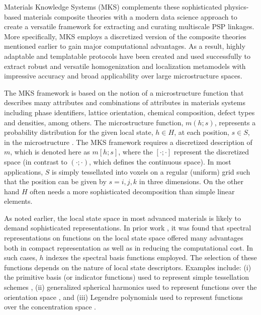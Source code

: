 \documentclass{bmcart}
\begin{document}
 Materials Knowledge Systems (MKS) \cite{landi2010multi, kalidindi2010novel, yabansu2014calibrated, al2012multi, kalidindi2011microstructure, gupta2015structure,  cceccen2014data} complements these sophisticated physics-based materials composite theories with a modern data science approach to create a versatile framework for extracting and curating multiscale PSP linkages. More specifically, MKS employs a discretized version of the composite theories mentioned earlier to gain major computational advantages. As a result, highly adaptable and templatable protocols have been created and used successfully to extract robust and versatile homogenization and localization metamodels with impressive accuracy and broad applicability over large microstructure spaces.

The MKS framework is based on the notion of a microstructure function
that describes many attributes and combinations of attributes in
materials systems including phase identifiers, lattice orientation,
chemical composition, defect types and densities, among others. The
microstructure function, $m \left(h; s\right)$, represents a
probability distribution for the given local state, $h \in H$, at each
position, $s \in S$, in the microstructure \cite{niezgoda2013novel,
  niezgoda2011understanding,
  qidwai2012estimating,niezgoda2010optimized}.  The MKS framework
requires a discretized description of $m$, which is denoted here as
$m\left[h; s\right]$, where the $\left[\cdot;\cdot\right]$ represent
the discretized space (in contrast to $\left(\cdot;\cdot\right)$,
which defines the continuous space).  In most applications, $S$ is
simply tessellated into voxels on a regular (uniform) grid such that
the position can be given by $s = i, j, k$ in three dimensions. On the
other hand $H$ often needs a more sophisticated decomposition than
simple linear elements.

As noted earlier, the local state space in most advanced materials is
likely to demand sophisticated representations. In prior work
\cite{yabansu2014calibrated, yabansu2015representation,
  brough2016microstructure}, it was found that spectral
representations on functions on the local state space offered many
advantages both in compact representation as well as in reducing the
computational cost. In such cases, $h$ indexes the spectral basis
functions employed. The selection of these functions depends on the
nature of local state descriptors. Examples include: (i) the primitive
basis (or indicator functions) used to represent simple tessellation
schemes \cite{landi2010multi, kalidindi2010novel, al2012multi,
  kalidindi2011microstructure, gupta2015structure, cceccen2014data,
  niezgoda2013novel, niezgoda2011understanding, cecen2016versatile},
(ii) generalized spherical harmonics used to represent functions over
the orientation space \cite{yabansu2014calibrated,
  yabansu2015representation}, and (iii) Legendre polynomials used to
represent functions over the concentration space
\cite{brough2016microstructure}.
\end{document}
